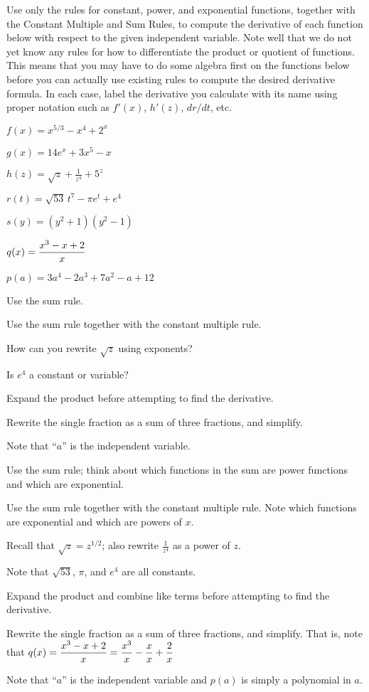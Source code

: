 \begin{activity} \label{A:2.1.2}  Use only the rules for constant, power, and exponential functions, together with the Constant Multiple and Sum Rules,  to compute the derivative of each function below with respect to the given independent variable.  Note well that we do not yet know any rules for how to differentiate the product or quotient of functions.  This means that you may have to do some algebra first on the functions below before you can actually use existing rules to compute the desired derivative formula.  In each case, label the derivative you calculate with its name using proper notation such as $f'(x)$, $h'(z)$, $dr/dt$, etc.
\ba
	  \item $f(x) = x^{5/3} - x^4 + 2^x$
	  \item $g(x) = 14e^x + 3x^5 - x$
	  \item $h(z) = \sqrt{z} + \frac{1}{z^4} + 5^z$
	  \item $r(t) = \sqrt{53} \, t^7 - \pi e^t + e^4$
	  \item $s(y) = (y^2 + 1)(y^2 - 1)$
	  \item $q(x) = \displaystyle \frac{x^3 - x + 2}{x}$
	  \item $p(a) = 3a^4 - 2a^3 + 7a^2 - a + 12$
\ea

\end{activity}
\begin{smallhint}
\ba
	  \item Use the sum rule.
	  \item Use the sum rule together with the constant multiple rule.
	  \item How can you rewrite $\sqrt{z}$ using exponents?
	  \item Is $e^4$ a constant or variable?
	  \item Expand the product before attempting to find the derivative.
	  \item Rewrite the single fraction as a sum of three fractions, and simplify.
	  \item Note that ``$a$'' is the independent variable.
\ea
\end{smallhint}
\begin{bighint}
\ba
	  \item Use the sum rule; think about which functions in the sum are power functions and which are exponential.
	  \item Use the sum rule together with the constant multiple rule.  Note which functions are exponential and which are powers of $x$.
	  \item Recall that $\sqrt{z} = z^{1/2}$; also rewrite $\frac{1}{z^4}$ as a power of $z$.
	  \item Note that $\sqrt{53}$, $\pi$, and $e^4$ are all constants.
	  \item Expand the product and combine like terms before attempting to find the derivative.
	  \item Rewrite the single fraction as a sum of three fractions, and simplify.  That is, note that $q(x) = \displaystyle \frac{x^3 - x + 2}{x} = \displaystyle \frac{x^3}{x} - \frac{x}{x} + \frac{2}{x}$
	  \item Note that ``$a$'' is the independent variable and $p(a)$ is simply a polynomial in $a$.
\ea
\end{bighint}
